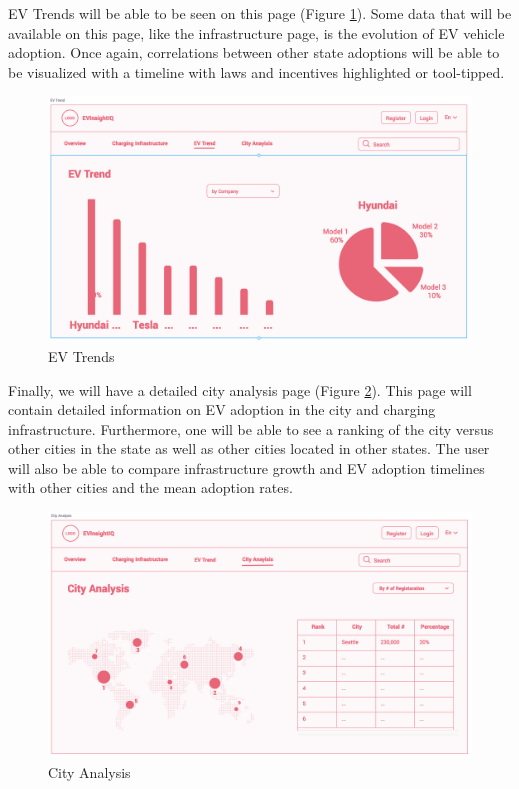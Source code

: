 \documentclass{article}
\begin{document}
EV Trends will be able to be seen on this page (Figure \ref{fig:evtrends}).
Some data that will be available on this page, like the infrastructure page, is
the evolution of EV vehicle adoption.  Once again, correlations between other
state adoptions will be able to be visualized with a timeline with laws and
incentives highlighted or tool-tipped.
\begin{figure}[h]
    \centering
    \includegraphics[scale=0.25]{EV Trends}
    \caption{EV Trends}
    \label{fig:evtrends}
\end{figure}

Finally, we will have a detailed city analysis page (Figure \ref{fig:city}).
This page will contain detailed information on EV adoption in the city and
charging infrastructure.  Furthermore, one will be able to see a ranking of the
city versus other cities in the state as well as other cities located in other
states.  The user will also be able to compare infrastructure growth and EV
adoption timelines with other cities and the mean adoption rates.
\begin{figure}[h]
    \centering
    \includegraphics[scale=0.25]{City Analysis}
    \caption{City Analysis}
    \label{fig:city}
\end{figure}
\end{document}
